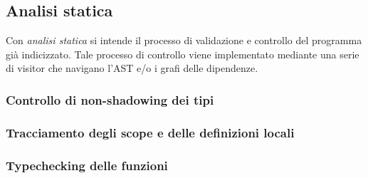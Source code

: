 \subsection{Analisi statica}
Con \textit{analisi statica} si intende il processo di validazione e controllo 
del programma già indicizzato. Tale processo di controllo viene implementato mediante 
una serie di visitor che navigano l'AST e/o i grafi delle dipendenze.



\subsubsection{Controllo di non-shadowing dei tipi}
\subsubsection{Tracciamento degli scope e delle definizioni locali}
\subsubsection{Typechecking delle funzioni}